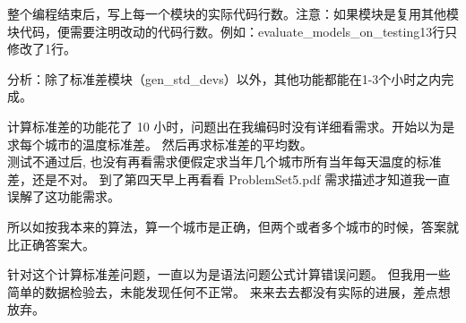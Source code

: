 整个编程结束后，写上每一个模块的实际代码行数。注意：如果模块是复用其他模块代码，便需要注明改动的代码行数。例如：evaluate\_models\_on\_testing13行只修改了1行。

分析：除了标准差模块（gen\_std\_devs）以外，其他功能都能在1-3个小时之内完成。

计算标准差的功能花了 10
小时，问题出在我编码时没有详细看需求。开始以为是求每个城市的温度标准差。
然后再求标准差的平均数。\\
测试不通过后,
也没有再看需求便假定求当年几个城市所有当年每天温度的标准差，还是不对。
到了第四天早上再看看 ProblemSet5.pdf
需求描述才知道我一直误解了这功能需求。



所以如按我本来的算法，算一个城市是正确，但两个或者多个城市的时候，答案就比正确答案大。

针对这个计算标准差问题，一直以为是语法问题公式计算错误问题。
但我用一些简单的数据检验去，未能发现任何不正常。
来来去去都没有实际的进展，差点想放弃。

